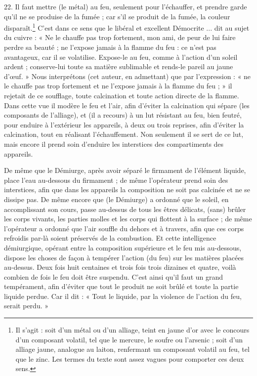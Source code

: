 \documentclass[a4paper, 11pt, oneside, polutonikogreek, french]{article}
\begin{document}
22. Il faut mettre (le métal) au feu, seulement pour l'échauffer, et prendre garde qu'il ne se produise de la fumée ; car s'il se produit de la fumée, la couleur disparaît.\footnote{Il s'agit : soit d'un métal ou d'un alliage, teint en jaune d'or avec le concours d'un composant volatil, tel que le mercure, le soufre ou l'arsenic ; soit d'un alliage jaune, analogue au laiton, renfermant un composant volatil au feu, tel que le zinc. Les termes du texte sont assez vagues pour comporter ces deux sens.} C'est dans ce sens que le libéral et excellent Démocrite ... dit au sujet du cuivre : « Ne le chauffe pas trop fortement, mon ami, de peur de lui faire perdre sa beauté ; ne l'expose jamais à la flamme du feu : ce n'est pas avantageux, car il se volatilise. Expose-le au feu, comme à l'action d'un soleil ardent ; conserve-lui toute sa matière sublimable et rends-le pareil au jaune d'œuf. » Nous interprétons (cet auteur, en admettant) que par l'expression : « ne le chauffe pas trop fortement et ne l'expose jamais à la flamme du feu ; » il rejetait de ce soufflage, toute calcination et toute action directe de la flamme. Dans cette vue il modère le feu et l'air, afin d'éviter la calcination qui sépare (les composants de l'alliage), et (il a recours) à un lut résistant au feu, bien feutré, pour enduire à l'extérieur les appareils, à deux ou trois reprises, afin d'éviter la calcination, tout en réalisant l'échauffement. Non seulement il se sert de ce lut, mais encore il prend soin d'enduire les interstices des compartiments des appareils.

De même que le Démiurge, après avoir séparé le firmament de l'élément liquide, place l'eau au-dessous du firmament ; de même l'opérateur prend soin des interstices, afin que dans les appareils la composition ne soit pas calcinée et ne se dissipe pas. De même encore que (le Démiurge) a ordonné que le soleil, en accomplissant son cours, passe au-dessus de tous les êtres délicats, (sans) brûler les corps vivants, les parties molles et les corps qui flottent à la surface ; de même l'opérateur a ordonné que l'air souffle du dehors et à travers, afin que ces corps refroidis par-là soient préservés de la combustion. Et cette intelligence démiurgique, opérant entre la composition supérieure et le feu mis au-dessous, dispose les choses de façon à tempérer l'action (du feu) sur les matières placées au-dessus. Deux fois huit centaines et trois fois trois dizaines et quatre, voilà combien de fois le feu doit être suspendu. C'est ainsi qu'il faut un grand tempérament, afin d'éviter que tout le produit ne soit brûlé et toute la partie liquide perdue. Car il dit : « Tout le liquide, par la violence de l'action du feu, serait perdu. »
\end{document}
